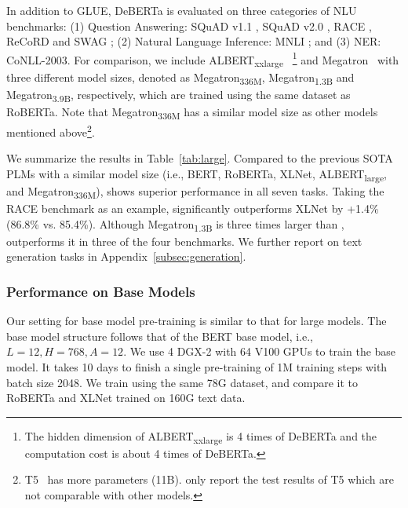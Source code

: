 In addition to GLUE, DeBERTa is evaluated on three categories of NLU benchmarks: 
(1) Question Answering: SQuAD v1.1 \citep{squad1}, SQuAD v2.0 \citep{squad2}, RACE \citep{lai2017race}, ReCoRD \citep{zhang2018record} and SWAG \citep{zellers2018swag}; 
(2) Natural Language Inference: MNLI \citep{mnli2018}; and 
(3) NER: CoNLL-2003.
For comparison, we include 
ALBERT\textsubscript{xxlarge}~\citep{lan2019albert}
\footnote{ The hidden dimension of ALBERT\textsubscript{xxlarge} is 4 times of DeBERTa and the computation cost is about 4 times of DeBERTa.} and 
Megatron~\citep{shoeybi2019megatron} with three different model sizes, denoted as Megatron\textsubscript{336M}, Megatron\textsubscript{1.3B} and Megatron\textsubscript{3.9B}, respectively, which are trained using the same dataset as RoBERTa. 
Note that Megatron\textsubscript{336M} has a similar model size as other models mentioned above\footnote{T5~\citep{raffel2019t5} has more parameters (11B). \cite{raffel2019t5} only report the test results of T5 which are not comparable with other models.}. 

We summarize the results in Table~{\ref{tab:large}}. 
Compared to the previous SOTA PLMs with a similar model size (i.e., BERT, RoBERTa, XLNet,  ALBERT\textsubscript{large}, and Megatron\textsubscript{336M}),  {\ModelName} shows superior performance in all seven tasks. 
Taking the RACE benchmark as an example, {\ModelName} significantly outperforms XLNet by +1.4\% (86.8\% vs. 85.4\%). 
Although Megatron\textsubscript{1.3B} is three times larger than {\ModelName}, {\ModelName} outperforms it in three of the four benchmarks. We further report {\ModelName} on text generation tasks in Appendix~\ref{subsec:generation}.

\subsubsection{Performance on Base Models}
Our setting for base model pre-training is similar to that for large models. 
The base model structure follows that of the BERT base model, i.e., $L=12, H=768, A=12$. 
We use 4 DGX-2 with 64 V100 GPUs to train the base model. 
It takes 10 days to finish a single pre-training of 1M training steps with batch size 2048. 
We train {\ModelName} using the same 78G dataset, and compare it to RoBERTa and XLNet trained on 160G text data. 

